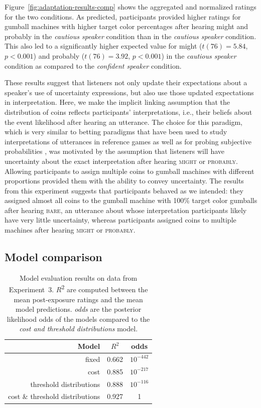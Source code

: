 \documentclass[man, floatsintext]{apa6}
\begin{document}
Figure~\ref{fig:adaptation-results-comp} shows the aggregated and normalized ratings for the two conditions.  As predicted, participants provided higher ratings for gumball machines with higher target color percentages after hearing {\sc might} and {\sc probably} in the \emph{cautious speaker} condition than in the \emph{cautious speaker} condition. This also led to a significantly higher expected value for {\sc might} ($t(76)=5.84$, $p<0.001$) and {\sc probably} ($t(76)=3.92$, $p<0.001$) in the \emph{cautious speaker} condition as compared to the \emph{confident speaker} condition.

These results suggest that listeners not only update their expectations about a speaker's use of uncertainty expressions, but also use those updated expectations in interpretation. 
Here, we make the implicit linking assumption that the distribution of coins reflects participants' interpretations, i.e., their beliefs about the event likelihood after hearing an utterance.
The choice for this paradigm, which is very similar to betting paradigms that have been used to study interpretations of utterances in reference games \parencite{Frank2012,Goodman2013} as well as for probing subjective probabilities \parencite[e.g.,][]{Hampton1973}, was motivated by the assumption that listeners will have uncertainty about the exact interpretation after hearing \textsc{might} or \textsc{probably}. Allowing
participants to assign multiple coins to gumball machines with different proportions provided them with the ability to convey uncertainty. The results from this experiment suggests that
participants behaved as we intended: they assigned almost all coins to the gumball machine with 100\% target color gumballs after hearing \textsc{bare}, 
an utterance about whose interpretation participants likely have very little uncertainty, whereas participants assigned coins to multiple machines after hearing \textsc{might} or \textsc{probably}. 


\subsection{Model comparison}

\begin{table}
\center
\begin{tabular}{r | c | c }
Model & $R^2$ &   odds  \\ \midrule
fixed & 0.662 & $10^{-442}$    \\
cost & 0.885 &  $10^{-217}$  \\
threshold distributions & 0.888 & $10^{-116}$  \\
cost \& threshold distributions & 0.927 & 1 \\
\end{tabular}
\caption{Model evaluation results on data from Experiment~3.  $R$\textsuperscript{$2$} are computed between  the mean post-exposure ratings and the mean model predictions. \textit{odds} are the posterior likelihood odds of the models compared to the \textit{cost and threshold distributions} model.  \label{tbl:model-comparison-comp}}
\end{table}
\end{document}
